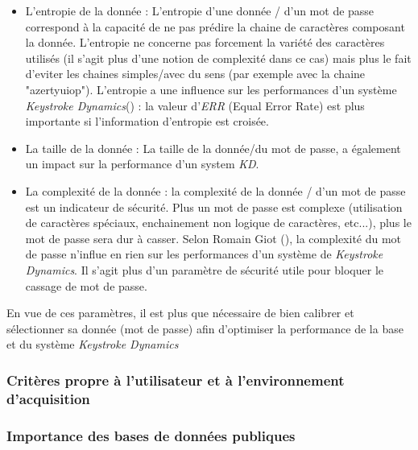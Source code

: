 \begin{itemize}
\item L'entropie de la donnée : L'entropie d'une donnée / d'un mot de passe correspond à la capacité de ne pas prédire la chaine de caractères composant la donnée. L'entropie ne concerne pas forcement la variété des caractères utilisés (il s'agit plus d'une notion de complexité dans ce cas) mais plus le fait d'eviter les chaines simples/avec du sens (par exemple avec la chaine "azertyuiop"). L'entropie a une influence sur les performances d'un système \textit{Keystroke Dynamics}(\cite{giotWeb}) : la valeur d'\textit{ERR} (Equal Error Rate) est plus importante si l'information d'entropie est croisée.\\

\item La taille de la donnée : La taille de la donnée/du mot de passe, a également un impact sur la performance d'un system \textit{KD}.\\

\item La complexité de la donnée : la complexité de la donnée / d'un mot de passe est un indicateur de sécurité. Plus un mot de passe est complexe (utilisation de caractères spéciaux, enchainement non logique de caractères, etc...), plus le mot de passe sera dur à casser. Selon Romain Giot (\cite{giotWeb}), la complexité du mot de passe n'influe en rien sur les performances d'un système de \textit{Keystroke Dynamics}. Il s'agit plus d'un paramètre de sécurité utile pour bloquer le cassage de mot de passe.\\

\end{itemize}

En vue de ces paramètres, il est plus que nécessaire de bien calibrer et sélectionner sa donnée (mot de passe) afin d'optimiser la performance de la base et du système \textit{Keystroke Dynamics}\\

\subsubsection{Critères propre à l'utilisateur et à l'environnement d'acquisition}


\subsubsection{Importance des bases de données publiques}

